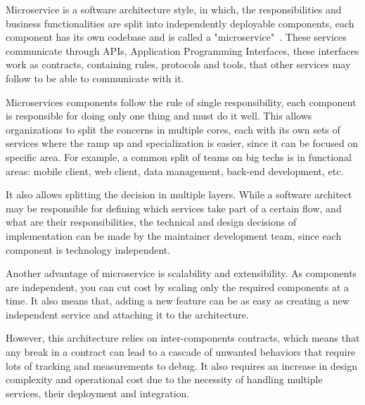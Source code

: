 Microservice is a software architecture style, in which, the responsibilities and business functionalities are split into independently deployable components, each component has its own codebase and is called a "microservice"~\cite{Micro}. These services communicate through APIs, Application Programming Interfaces, these interfaces work as contracts, containing rules, protocols and tools, that other services may follow to be able to communicate with it.

Microservices components follow the rule of single responsibility, each component is responsible for doing only one thing and must do it well. This allows organizations to split the concerns in multiple cores, each with its own sets of services where the ramp up and specialization is easier, since it can be focused on specific area. For example, a common split of teams on big techs is in functional areas: mobile client, web client, data management, back-end development, etc.

It also allows splitting the decision in multiple layers. While a software architect may be responsible for defining which services take part of a certain flow, and what are their responsibilities, the technical and design decisions of implementation can be made by the maintainer development team, since each component is technology independent.

Another advantage of microservice is scalability and extensibility. As components are independent, you can cut cost by scaling only the required components at a time. It also means that, adding a new feature can be as easy as creating a new independent service and attaching it to the architecture.

However, this architecture relies on inter-components contracts, which means that any break in a contract can lead to a cascade of unwanted behaviors that require lots of tracking and measurements to debug. It also requires an increase in design complexity and operational cost due to the necessity of handling multiple services, their deployment and integration.

